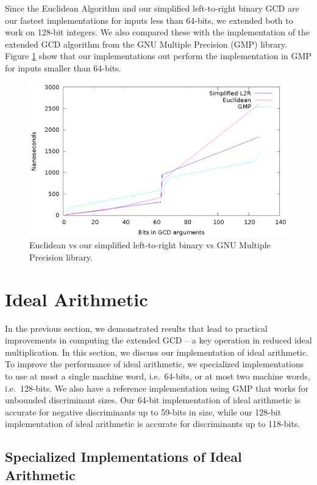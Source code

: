 \documentclass{ucalgthes1}
\theoremstyle{definition}
\begin{document}
Since the Euclidean Algorithm and our simplified left-to-right binary GCD are our fastest implementations for inputs less than 64-bits, we extended both to work on 128-bit integers.  We also compared these with the implementation of the extended GCD algorithm from the GNU Multiple Precision (GMP) library.  Figure \ref{fig:mpzgcd} show that our implementations out perform the implementation in GMP for inputs smaller than 64-bits.
\begin{figure}[H]
\centering
\includegraphics{mpzgcd}
\caption{Euclidean vs our simplified left-to-right binary vs GNU Multiple Precision library.}
\label{fig:mpzgcd}
\end{figure}

\section{Ideal Arithmetic}
\label{sec:idealArithmetic}

In the previous section, we demonstrated results that lead to practical improvements in computing the extended GCD -- a key operation in reduced ideal multiplication.  In this section, we discuss our implementation of ideal arithmetic.  To improve the performance of ideal arithmetic, we specialized implementations to use at most a single machine word, i.e.\ 64-bits, or at most two machine words, i.e.\ 128-bits.  We also have a reference implementation using GMP that works for unbounded discriminant sizes.  Our 64-bit implementation of ideal arithmetic is accurate for negative discriminants up to 59-bits  in size, while our 128-bit implementation of ideal arithmetic is accurate for discriminants up to 118-bits.

\subsection{Specialized Implementations of Ideal Arithmetic}
\end{document}
